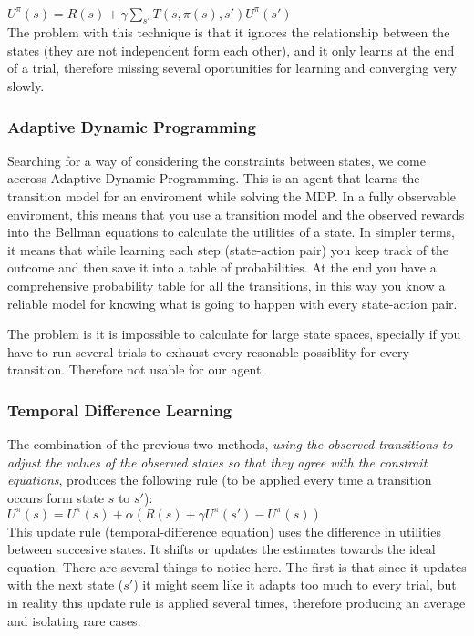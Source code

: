 $U^\pi(s) = R(s)+\gamma\sum_{s'}T(s,\pi(s),s') U^\pi(s')$\\

The problem with this technique is that it ignores the relationship between the states (they are not independent form each other), and it only learns at the end of a trial, therefore missing several oportunities for learning and converging very slowly\cite{rl}.

\subsubsection{Adaptive Dynamic Programming}

Searching for a way of considering the constraints between states, we come accross Adaptive Dynamic Programming. This is an agent that learns the transition model for an enviroment while solving the MDP. In a fully observable enviroment, this means that you use a transition model and the observed rewards into the Bellman equations to calculate the utilities of a state. In simpler terms, it means that while learning each step (state-action pair) you keep track of the outcome and then save it into a table of probabilities. At the end you have a comprehensive probability table for all the transitions, in this way you know a reliable model for knowing what is going to happen with every state-action pair\cite{rl}.

The problem is it is impossible to calculate for large state spaces, specially if you have to run several trials to exhaust every resonable possiblity for every transition. Therefore not usable for our agent. 

\subsubsection{Temporal Difference Learning}

The combination of the previous two methods, \textit{using the observed transitions to adjust the values of the observed states so that they agree with the constrait equations}\cite[p767]{rl}, produces the following rule (to be applied every time a transition occurs form state $s$ to $s'$):\\

$U^\pi(s) = U^\pi(s) + \alpha(R(s)+\gamma U^\pi(s') -  U^\pi(s))$\\

This update rule (temporal-difference equation) uses the difference in utilities between succesive states. It shifts or updates the estimates towards the ideal equation. There are several things to notice here. The first is that since it updates with the next state ($s'$) it might seem like it adapts too much to every trial, but in reality this update rule is applied several times, therefore producing an average and isolating rare cases. \cite{rl} 

